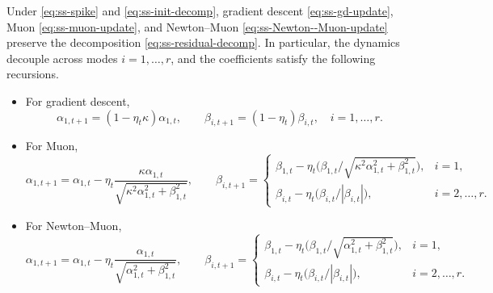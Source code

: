 \documentclass[10pt,a4paper]{amsart}
\begin{document}
\begin{lemma}
\label{lem:ss-mode-wise}
Under \eqref{eq:ss-spike} and \eqref{eq:ss-init-decomp}, gradient descent \eqref{eq:ss-gd-update}, Muon \eqref{eq:ss-muon-update}, and Newton--Muon \eqref{eq:ss-Newton--Muon-update} preserve the decomposition \eqref{eq:ss-residual-decomp}. In particular, the dynamics decouple across modes $i=1,\dots,r$, and the coefficients satisfy the following recursions.
\begin{itemize}
\item For gradient descent,
\begin{equation}
\label{eq:ss-rec-gd}
\alpha_{1,t+1}=(1-\eta_t\kappa)\alpha_{1,t},
\qquad
\beta_{i,t+1}=(1-\eta_t)\beta_{i,t},\quad i=1,\dots,r.
\end{equation}

\item For Muon,
\begin{equation}
\label{eq:ss-rec-muon}
\alpha_{1,t+1}
=
\alpha_{1,t}
-
\eta_t \frac{\kappa\alpha_{1,t}}{\sqrt{\kappa^2\alpha_{1,t}^2+\beta_{1,t}^2}},
\qquad
\beta_{i,t+1}
=
\begin{cases}
\beta_{1,t}
-\eta_t \bigl(\beta_{1,t}/\sqrt{\kappa^2\alpha_{1,t}^2+\beta_{1,t}^2}\bigr),
& i=1, \\
\beta_{i,t}
-\eta_t \bigl(\beta_{i,t}/|\beta_{i,t}|\bigr),
& i=2,\dots,r.
\end{cases}
\end{equation}

\item For Newton--Muon,
\begin{equation}
\label{eq:ss-rec-Newton--Muon}
\alpha_{1,t+1}
=
\alpha_{1,t}
-
\eta_t \frac{\alpha_{1,t}}{\sqrt{\alpha_{1,t}^2+\beta_{1,t}^2}},
\qquad
\beta_{i,t+1}
=
\begin{cases}
\beta_{1,t}
-\eta_t \bigl(\beta_{1,t}/\sqrt{\alpha_{1,t}^2+\beta_{1,t}^2}\bigr),
& i=1, \\
\beta_{i,t}
-\eta_t \bigl(\beta_{i,t}/|\beta_{i,t}|\bigr),
& i=2,\dots,r.
\end{cases}
\end{equation}
\end{itemize}
\end{lemma}
\end{document}
